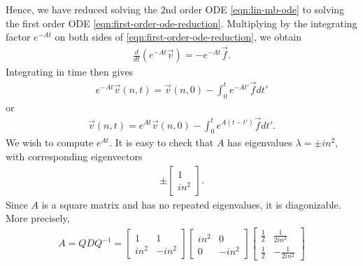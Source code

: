 \documentclass[12pt,reqno]{amsart}
\numberwithin{equation}{section}  %
\numberwithin{figure}{section}
\theoremstyle{plain}
\theoremstyle{definition}
\theoremstyle{remark}
\begin{document}
%
%
Hence, we have reduced solving the $2$nd order ODE \eqref{eqn:lin-mb-ode} to
solving the first order ODE \eqref{eqn:first-order-ode-reduction}. Multiplying
by the integrating factor $e^{-At}$ on both sides of
\eqref{eqn:first-order-ode-reduction}, we obtain
%
%
\begin{equation*}
\begin{split}
  \frac{d}{dt}(e^{-At} \vec v) = -e^{-At} \vec f.
\end{split}
\end{equation*}
%
%
Integrating in time then gives
%
%
\begin{equation*}
\begin{split}
  e^{-At} \vec v(n, t) = \vec v(n, 0) - \int_{0}^{t}e^{-At'} \vec f dt'
\end{split}
\end{equation*}
%
%
or
%
%
\begin{equation}
  \label{ode-vec-soln}
\begin{split}
  \vec v(n, t) = e^{At} \vec v(n, 0) - \int_{0}^{t}e^{A(t - t')} \vec f dt'.
\end{split}
\end{equation}
%
%
We wish to compute $e^{At}$. It is easy to check that $A$ has eigenvalues
$\lambda = \pm in^{2}$, with corresponding eigenvectors 
%
%
\begin{equation*}
\begin{split}
\pm \begin{bmatrix}
1 \\
in^{2}
\end{bmatrix}.
\end{split}
\end{equation*}
%
%
Since $A$ is a square matrix and has no repeated
eigenvalues, it is diagonizable. More precisely,
%
%
%
%
\begin{equation*}
\begin{split}
  A = Q D Q^{-1} = 
  \begin{bmatrix}
  1 & 1
  \\
  in^{2} & -in^{2}
  \end{bmatrix}
  \begin{bmatrix}
    in^{2} & 0 
    \\
    0 & -in^{2}
  \end{bmatrix}
  \begin{bmatrix}
    \frac{1}{2} & \frac{1}{2i n^{2}} \\
    \frac{1}{2} & -\frac{1}{2i n^{2} }
  \end{bmatrix}
\end{split}
\end{equation*}
\end{document}
